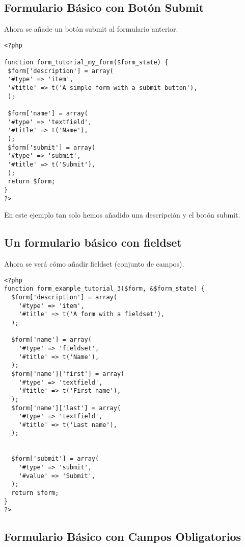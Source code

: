 \documentclass[11pt]{article}
\begin{document}
\subsection{Formulario Básico con Botón Submit}
\label{sec-4.4}


Ahora se añade un botón submit al formulario anterior.


\begin{verbatim}
<?php

function form_tutorial_my_form($form_state) {
 $form['description'] = array(
 '#type' => 'item',
 '#title' => t('A simple form with a submit button'),
 );
 
 $form['name'] = array(
 '#type' => 'textfield',
 '#title' => t('Name'),
 );
 $form['submit'] = array(
 '#type' => 'submit',
 '#title' => t('Submit'),
 );
 return $form;
}
?>
\end{verbatim}



En este ejemplo tan solo hemos añadido una descripción y el botón
submit.

\subsection{Un formulario básico con fieldset}
\label{sec-4.5}


Ahora se verá cómo añadir fieldset (conjunto de campos).


\begin{verbatim}
<?php
function form_example_tutorial_3($form, &$form_state) {
  $form['description'] = array(
    '#type' => 'item', 
    '#title' => t('A form with a fieldset'),
  );

  $form['name'] = array(
    '#type' => 'fieldset', 
    '#title' => t('Name'),
  );
  $form['name']['first'] = array(
    '#type' => 'textfield', 
    '#title' => t('First name'),
  );
  $form['name']['last'] = array(
    '#type' => 'textfield', 
    '#title' => t('Last name'),
  );


  $form['submit'] = array(
    '#type' => 'submit', 
    '#value' => 'Submit',
  );
  return $form;
}
?>
\end{verbatim}



\subsection{Formulario Básico con Campos Obligatorios}
\label{sec-4.6}
\end{document}
